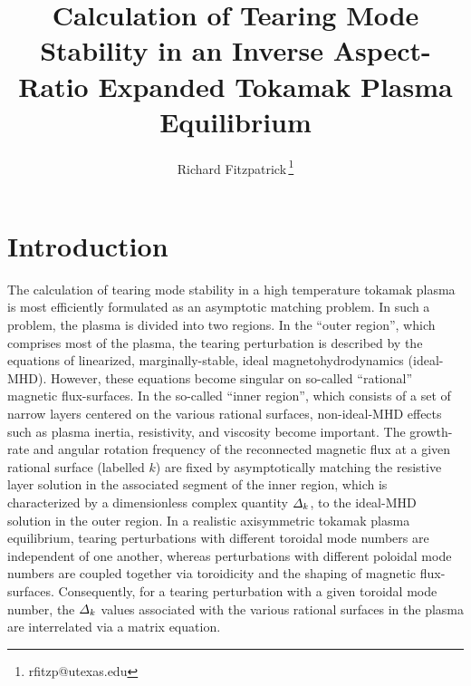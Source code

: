 \documentclass[12pt,prb,aps]{revtex4-1}
\begin{document}
\title{Calculation of Tearing Mode Stability in an Inverse Aspect-Ratio Expanded Tokamak Plasma Equilibrium}
\author{Richard Fitzpatrick\,\footnote{rfitzp@utexas.edu}}

\maketitle

\section{Introduction} 
The calculation of tearing mode stability in a high temperature tokamak plasma is most efficiently formulated as  an asymptotic
matching problem.\cite{fkr} In such a problem, the  plasma is  divided into two regions. In the ``outer region'', which comprises most
of the plasma, the tearing perturbation is described by the equations of linearized, marginally-stable, ideal magnetohydrodynamics (ideal-MHD).
However, these equations become singular on so-called ``rational'' magnetic flux-surfaces. In the so-called ``inner region'', which
consists of a set of narrow layers centered on the various rational surfaces, non-ideal-MHD effects such as plasma inertia, resistivity, and
viscosity become important. The growth-rate and angular rotation frequency of the reconnected magnetic flux at a given rational
surface (labelled $k$) are fixed by asymptotically matching the resistive layer
solution in the associated segment of the inner region, which is characterized by a dimensionless complex quantity ${\mit\Delta}_k$,  to the ideal-MHD solution in the outer region. In a realistic axisymmetric tokamak  plasma equilibrium, tearing
perturbations with different toroidal mode numbers are independent of one another, whereas perturbations with different poloidal
mode numbers are coupled together via toroidicity and the shaping of magnetic flux-surfaces.\cite{con0}
Consequently, for a tearing perturbation with a given toroidal mode number, 
 the ${\mit\Delta}_k$ values associated with  the various rational surfaces in the plasma are interrelated via a matrix equation.\cite{connor,cht,tokuda,brennan, ham,am1,am3}
\end{document}
